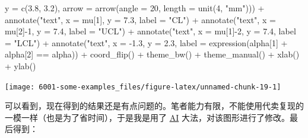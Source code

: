 \documentclass[
]{book}
\newenvironment{Shaded}{\begin{snugshade}}{\end{snugshade}}
\newcommand{\AttributeTok}[1]{\textcolor[rgb]{0.77,0.63,0.00}{#1}}
\newcommand{\DecValTok}[1]{\textcolor[rgb]{0.00,0.00,0.81}{#1}}
\newcommand{\FloatTok}[1]{\textcolor[rgb]{0.00,0.00,0.81}{#1}}
\newcommand{\FunctionTok}[1]{\textcolor[rgb]{0.00,0.00,0.00}{#1}}
\newcommand{\NormalTok}[1]{#1}
\newcommand{\SpecialCharTok}[1]{\textcolor[rgb]{0.00,0.00,0.00}{#1}}
\newcommand{\StringTok}[1]{\textcolor[rgb]{0.31,0.60,0.02}{#1}}
\begin{document}
\begin{Shaded}
\begin{Highlighting}[]
             \AttributeTok{y =} \FunctionTok{c}\NormalTok{(}\FloatTok{3.8}\NormalTok{, }\FloatTok{3.2}\NormalTok{),}
             \AttributeTok{arrow =} \FunctionTok{arrow}\NormalTok{(}\AttributeTok{angle =} \DecValTok{20}\NormalTok{, }\AttributeTok{length =} \FunctionTok{unit}\NormalTok{(}\DecValTok{4}\NormalTok{, }\StringTok{"mm"}\NormalTok{))) }\SpecialCharTok{+}
  \FunctionTok{annotate}\NormalTok{(}\StringTok{"text"}\NormalTok{, }\AttributeTok{x =}\NormalTok{ mu[}\DecValTok{1}\NormalTok{], }\AttributeTok{y =} \FloatTok{7.3}\NormalTok{, }\AttributeTok{label =} \StringTok{"CL"}\NormalTok{) }\SpecialCharTok{+}
  \FunctionTok{annotate}\NormalTok{(}\StringTok{"text"}\NormalTok{, }\AttributeTok{x =}\NormalTok{ mu[}\DecValTok{2}\NormalTok{]}\SpecialCharTok{{-}}\DecValTok{1}\NormalTok{, }\AttributeTok{y =} \FloatTok{7.4}\NormalTok{, }\AttributeTok{label =} \StringTok{"UCL"}\NormalTok{) }\SpecialCharTok{+}
  \FunctionTok{annotate}\NormalTok{(}\StringTok{"text"}\NormalTok{, }\AttributeTok{x =}\NormalTok{ mu[}\DecValTok{1}\NormalTok{]}\SpecialCharTok{{-}}\DecValTok{2}\NormalTok{, }\AttributeTok{y =} \FloatTok{7.4}\NormalTok{, }\AttributeTok{label =} \StringTok{"LCL"}\NormalTok{) }\SpecialCharTok{+}
  \FunctionTok{annotate}\NormalTok{(}\StringTok{"text"}\NormalTok{, }\AttributeTok{x =} \SpecialCharTok{{-}}\FloatTok{1.3}\NormalTok{, }\AttributeTok{y =} \FloatTok{2.3}\NormalTok{, }\AttributeTok{label =} \FunctionTok{expression}\NormalTok{(alpha[}\DecValTok{1}\NormalTok{] }\SpecialCharTok{+}\NormalTok{ alpha[}\DecValTok{2}\NormalTok{] }\SpecialCharTok{==}\NormalTok{ alpha)) }\SpecialCharTok{+}
  \FunctionTok{coord\_flip}\NormalTok{() }\SpecialCharTok{+}
  \FunctionTok{theme\_bw}\NormalTok{() }\SpecialCharTok{+}
  \FunctionTok{theme\_manual}\NormalTok{() }\SpecialCharTok{+} \FunctionTok{xlab}\NormalTok{(}\StringTok{\textquotesingle{}\textquotesingle{}}\NormalTok{) }\SpecialCharTok{+} \FunctionTok{ylab}\NormalTok{(}\StringTok{\textquotesingle{}\textquotesingle{}}\NormalTok{)}
\end{Highlighting}
\end{Shaded}

\begin{center}\texttt{[image: 6001-some-examples\_files/figure-latex/unnamed-chunk-19-1]} \end{center}

可以看到，现在得到的结果还是有点问题的。笔者能力有限，不能使用代卖复现的一模一样（也是为了省时间），于是我是用了 \href{https://mp.weixin.qq.com/s/BkPAsH8qDZzQkcBRgMsOSw}{AI} 大法，对该图形进行了修改。最后得到：
\end{document}
